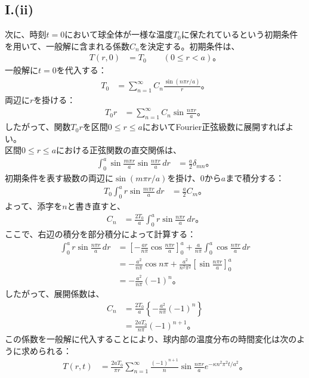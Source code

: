 \documentclass[platex,dvipdfmx,a4paper]{jsarticle}
\begin{document}
  \subsection*{I.(ii)}
  次に、時刻$t=0$において球全体が一様な温度$T_0$に保たれているという初期条件を用いて、一般解に含まれる係数$C_n$を決定する。初期条件は、
  \begin{align*}
    T(r,0)&=T_0\qquad (0\leq r<a)。
  \end{align*}
  一般解に$t=0$を代入する：
  \begin{align*}
    T_0
    &=\sum_{n=1}^{\infty}
      C_n\frac{\sin(n\pi r/a)}{r}。
  \end{align*}
  両辺に$r$を掛ける：
  \begin{align*}
    T_0r
    &=\sum_{n=1}^{\infty}
      C_n\sin\frac{n\pi r}{a}。
  \end{align*}
  したがって、関数$T_0r$を区間$0\leq r\leq a$においてFourier正弦級数に展開すればよい。\\
  区間$0\leq r\leq a$における正弦関数の直交関係は、
  \begin{align*}
    \int_0^a
    \sin\frac{m\pi r}{a}
    \sin\frac{n\pi r}{a}\,dr
    &=\frac{a}{2}\delta_{mn}。
  \end{align*}
  初期条件を表す級数の両辺に$\sin(m\pi r/a)$を掛け、$0$から$a$まで積分する：
  \begin{align*}
    T_0\int_0^a
    r\sin\frac{m\pi r}{a}\,dr
    &=\frac{a}{2}C_m。
  \end{align*}
  よって、添字を$n$と書き直すと、
  \begin{align*}
    C_n
    &=\frac{2T_0}{a}
      \int_0^a r\sin\frac{n\pi r}{a}\,dr。
  \end{align*}
  ここで、右辺の積分を部分積分によって計算する：
  \begin{align*}
    \int_0^a r\sin\frac{n\pi r}{a}\,dr
    &=\left[
      -\frac{ar}{n\pi}\cos\frac{n\pi r}{a}
    \right]_0^a
    +\frac{a}{n\pi}
    \int_0^a\cos\frac{n\pi r}{a}\,dr\\
    &=-\frac{a^2}{n\pi}\cos n\pi
      +\frac{a^2}{n^2\pi^2}
      \left[
        \sin\frac{n\pi r}{a}
      \right]_0^a\\
    &=-\frac{a^2}{n\pi}(-1)^n。
  \end{align*}
  したがって、展開係数は、
  \begin{align*}
    C_n
    &=\frac{2T_0}{a}
      \left\{
        -\frac{a^2}{n\pi}(-1)^n
      \right\}\\
    &=\frac{2aT_0}{n\pi}(-1)^{n+1}。
  \end{align*}
  この係数を一般解に代入することにより、球内部の温度分布の時間変化は次のように求められる：
  \begin{align*}
    T(r,t)
    &=\frac{2aT_0}{\pi r}
      \sum_{n=1}^{\infty}
      \frac{(-1)^{n+1}}{n}
      \sin\frac{n\pi r}{a}
      e^{-\kappa n^2\pi^2t/a^2}。
  \end{align*}
  
\end{document}
